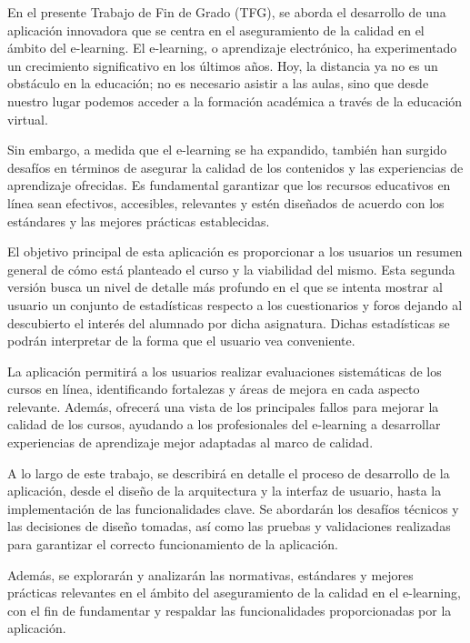
En el presente Trabajo de Fin de Grado (TFG), se aborda el desarrollo de una aplicación innovadora que se centra en el aseguramiento de la calidad en el ámbito del e-learning. El e-learning, o aprendizaje electrónico, ha experimentado un crecimiento significativo en los últimos años. Hoy, la distancia ya no es un obstáculo en la educación; no es necesario asistir a las aulas, sino que desde nuestro lugar podemos acceder a la formación académica a través de la educación virtual. \cite{educacionvirtual2023}

Sin embargo, a medida que el e-learning se ha expandido, también han surgido desafíos en términos de asegurar la calidad de los contenidos y las experiencias de aprendizaje ofrecidas. Es fundamental garantizar que los recursos educativos en línea sean efectivos, accesibles, relevantes y estén diseñados de acuerdo con los estándares y las mejores prácticas establecidas.\cite{buenaspracticas2017}

El objetivo principal de esta aplicación es proporcionar a los usuarios un resumen general de cómo está planteado el curso y la viabilidad del mismo. Esta segunda versión busca un nivel de detalle más profundo en el que se intenta mostrar al usuario un conjunto de estadísticas respecto a los cuestionarios y foros dejando al descubierto el interés del alumnado por dicha asignatura. Dichas estadísticas se podrán interpretar de la forma que el usuario vea conveniente. 

La aplicación permitirá a los usuarios realizar evaluaciones sistemáticas de los cursos en línea, identificando fortalezas y áreas de mejora en cada aspecto relevante. Además, ofrecerá una vista de los principales fallos para mejorar la calidad de los cursos, ayudando a los profesionales del e-learning a desarrollar experiencias de aprendizaje mejor adaptadas al marco de calidad.

A lo largo de este trabajo, se describirá en detalle el proceso de desarrollo de la aplicación, desde el diseño de la arquitectura y la interfaz de usuario, hasta la implementación de las funcionalidades clave. Se abordarán los desafíos técnicos y las decisiones de diseño tomadas, así como las pruebas y validaciones realizadas para garantizar el correcto funcionamiento de la aplicación.

Además, se explorarán y analizarán las normativas, estándares y mejores prácticas relevantes en el ámbito del aseguramiento de la calidad en el e-learning, con el fin de fundamentar y respaldar las funcionalidades proporcionadas por la aplicación.